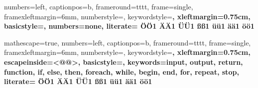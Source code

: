  {
numbers=left,
captionpos=b,
frameround=tttt,
frame=single,
framexleftmargin=6mm,
numberstyle=\tiny,
keywordstyle=\ttfamily\bfseries,
xleftmargin=0.75cm,
basicstyle=\ttfamily,
numbers=none,
literate=%
{Ö}{{\"O}}1
{Ä}{{\"A}}1
{Ü}{{\"U}}1
{ß}{{\ss}}1
{ü}{{\"u}}1
{ä}{{\"a}}1
{ö}{{\"o}}1
}

 {
mathescape=true,
numbers=left,
captionpos=b,
frameround=tttt,
frame=single,
framexleftmargin=6mm,
numberstyle=\tiny,
keywordstyle=\ttfamily\bfseries,
xleftmargin=0.75cm,
escapeinside={<@}{@>},
basicstyle=\ttfamily,
keywords={input, output, return, function, if, else, then, foreach, while, begin, end, for, repeat, stop},
literate=%
{Ö}{{\"O}}1
{Ä}{{\"A}}1
{Ü}{{\"U}}1
{ß}{{\ss}}1
{ü}{{\"u}}1
{ä}{{\"a}}1
{ö}{{\"o}}1
}

\makeatletter
\def\lst@visiblespace{{\protect\color{spacecolor}\textvisiblespace}}
\makeatother